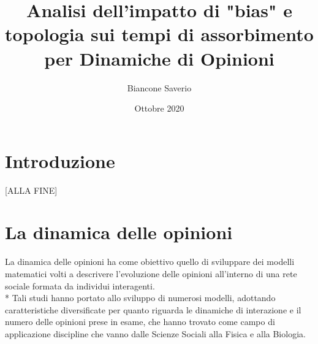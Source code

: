 \documentclass{article}
\title{Analisi dell'impatto di "bias" e topologia sui tempi di assorbimento per Dinamiche di Opinioni}
\author{Biancone Saverio}
\date{Ottobre 2020}
\begin{document}
\maketitle

\section{Introduzione}
[ALLA FINE]
\section{La dinamica delle opinioni}
La dinamica delle opinioni ha come obiettivo quello di sviluppare dei modelli matematici volti a descrivere l'evoluzione delle opinioni all'interno di una rete sociale formata da individui interagenti.\\*
Tali studi hanno portato allo sviluppo di numerosi modelli, adottando caratteristiche diversificate per quanto riguarda le dinamiche di interazione e il numero delle opinioni prese in esame, che hanno trovato come campo di applicazione discipline che vanno dalle Scienze Sociali alla Fisica e alla Biologia.
\end{document}
